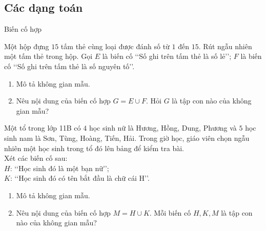 \subsection{Các dạng toán}
\begin{dang}{Biến cố hợp}
\end{dang}
\begin{vd}%
	Một hộp đựng $15$ tấm thẻ cùng loại được đánh số từ $1$ đến $15$. Rút ngẫu nhiên một tấm thẻ trong hộp. Gọi $E$ là biến cố \lq\lq  Số ghi trên tấm thẻ là số lẻ\rq\rq; $F$ là biến cố \lq\lq  Số ghi trên tấm thẻ là số nguyên tố\rq\rq.
	\begin{enumerate}
		\item Mô tả không gian mẫu.
		\item Nêu nội dung của biến cố hợp $G=E \cup F$. Hỏi $G$ là tập con nào của không gian mẫu?
	\end{enumerate}
\end{vd}
\begin{vd}%
	Một tổ trong lớp 11B có $4$ học sinh nữ là Hương, Hồng, Dung, Phương và $5$ học sinh nam là Sơn, Tùng, Hoàng, Tiến, Hải. Trong giờ học, giáo viên chọn ngẫu nhiên một học sinh trong tổ đó lên bảng để kiểm tra bài.\\
	Xét các biến cố sau:\\
	$H$: \lq\lq  Học sinh đó là một bạn nữ\rq\rq;\\
	$K$: \lq\lq  Học sinh đó có tên bắt đầu là chữ cái $\mathrm{H}$\rq\rq.
	\begin{enumerate}
		\item Mô tả không gian mẫu.
		\item Nêu nội dung của biến cố hợp $M=H \cup K$. Mỗi biến cố $H, K, M$ là tập con nào của không gian mẫu?
	\end{enumerate}
\end{vd}

